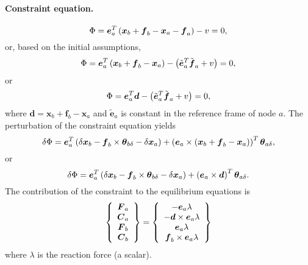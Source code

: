 \documentclass[10pt,dvips,fleqn]{report}
\newcommand{\T}[1]{\boldsymbol{#1}}
\begin{document}
\paragraph{Constraint equation.}
\begin{equation}
	\Phi = \T{e}_a^T \plbr{\T{x}_b + \T{f}_b - \T{x}_a - \T{f}_a} - v = 0 ,
\end{equation}
or, based on the initial assumptions,
\begin{equation}
	\Phi = \T{e}_a^T \plbr{\T{x}_b + \T{f}_b - \T{x}_a}
		- \plbr{\tilde{\T{e}}_a^T \tilde{\T{f}}_a + v} = 0 ,
\end{equation}
or
\begin{equation}
	\Phi = \T{e}_a^T \T{d}
		- \plbr{\tilde{\T{e}}_a^T \tilde{\T{f}}_a + v} = 0 ,
\end{equation}
where $\T{d}=\T{x}_b + \T{f}_b - \T{x}_a$ 
and $\tilde{\T{e}}_a$ is constant in the reference frame of node $a$.
The perturbation of the constraint equation yields
\begin{equation}
	\delta\Phi = 
		\T{e}_a^T \plbr{\delta\T{x}_b
		- \T{f}_b\times\T{\theta}_{b\delta}
		- \delta\T{x}_a
		} + \plbr{\T{e}_a \times \plbr{
			\T{x}_b + \T{f}_b - \T{x}_a
		}}^T \T{\theta}_{a\delta} ,
\end{equation}
or
\begin{equation}
	\delta\Phi = 
		\T{e}_a^T \plbr{\delta\T{x}_b
		- \T{f}_b\times\T{\theta}_{b\delta}
		- \delta\T{x}_a
		} + \plbr{\T{e}_a \times \T{d}}^T \T{\theta}_{a\delta} .
\end{equation}
The contribution of the constraint to the equilibrium equations is
\begin{equation}
	\cubr{\cvvect{
		\T{F}_a \\
		\T{C}_a \\
		\T{F}_b \\
		\T{C}_b
	}} = \cubr{\cvvect{
		- \T{e}_a \lambda \\
		- \T{d} \times \T{e}_a \lambda \\
		\T{e}_a \lambda \\
		\T{f}_b \times \T{e}_a \lambda
	}}
\end{equation}
where $\lambda$ is the reaction force (a scalar).
\end{document}
